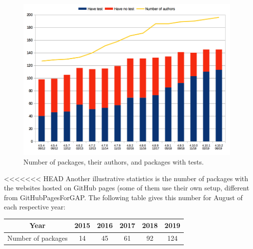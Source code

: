 \begin{figure}[!ht]
    \centering
    \includegraphics[width=\textwidth]{images/gap-package-tests}
    \caption{Number of \GAP packages, their authors, and packages with tests.}
    \label{fig:gap-package-tests}
\end{figure}

<<<<<<< HEAD
Another illustrative statistics is the number of \GAP packages
with the websites hosted on GitHub pages (some of them use
their own setup, different from {\sf GitHubPagesForGAP}.
The following table gives this number for August of each respective year:

\begin{center}
\begin{tabular}{| c | c | c | c | c | c |} 
\hline
Year & 2015 & 2016 & 2017 & 2018 & 2019 \\
\hline
Number of packages & 14 & 45 & 61 & 92 & 124 \\
\hline
\end{tabular}
\end{center}

